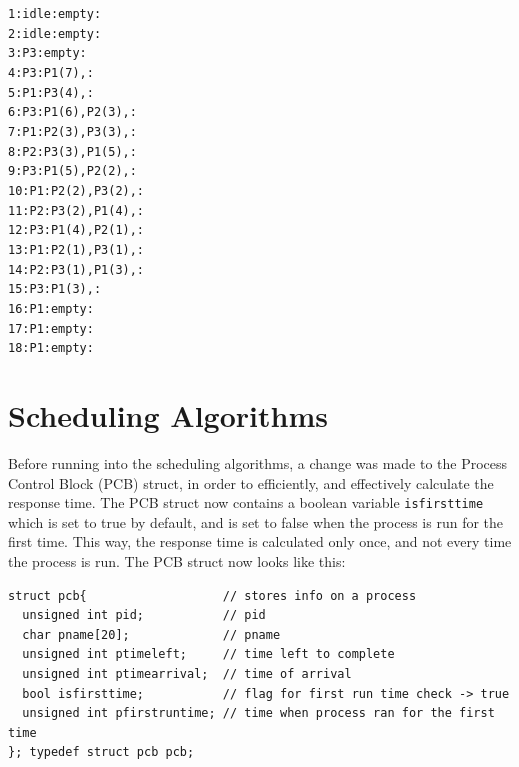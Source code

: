 \documentclass{article}
\theoremstyle{mytheoremstyle}
\theoremstyle{mytheoremstyle}
\theoremstyle{myproblemstyle}
\begin{document}
\noindent\texttt{1:idle:empty:} \\
\texttt{2:idle:empty:} \\
\texttt{3:P3:empty:} \\
\texttt{4:P3:P1(7),:} \\
\texttt{5:P1:P3(4),:} \\
\texttt{6:P3:P1(6),P2(3),:} \\
\texttt{7:P1:P2(3),P3(3),:} \\
\texttt{8:P2:P3(3),P1(5),:} \\
\texttt{9:P3:P1(5),P2(2),:} \\
\texttt{10:P1:P2(2),P3(2),:} \\
\texttt{11:P2:P3(2),P1(4),:} \\
\texttt{12:P3:P1(4),P2(1),:} \\
\texttt{13:P1:P2(1),P3(1),:} \\
\texttt{14:P2:P3(1),P1(3),:} \\
\texttt{15:P3:P1(3),:} \\
\texttt{16:P1:empty:} \\
\texttt{17:P1:empty:} \\
\texttt{18:P1:empty:}

\newpage
\section{Scheduling Algorithms}
Before running into the scheduling algorithms, a change was made to the Process Control Block (PCB) struct, in order to efficiently, and effectively calculate the response time. The PCB struct now contains a boolean variable \texttt{isfirsttime} which is set to true by default, and is set to false when the process is run for the first time. This way, the response time is calculated only once, and not every time the process is run. The PCB struct now looks like this:
\begin{lstlisting}[caption={Struct PCB - Process Control Block},label={lst:pcb}]
struct pcb{                   // stores info on a process
  unsigned int pid;           // pid
  char pname[20];             // pname
  unsigned int ptimeleft;     // time left to complete
  unsigned int ptimearrival;  // time of arrival
  bool isfirsttime;           // flag for first run time check -> true
  unsigned int pfirstruntime; // time when process ran for the first time
}; typedef struct pcb pcb;
\end{lstlisting}
\end{document}

